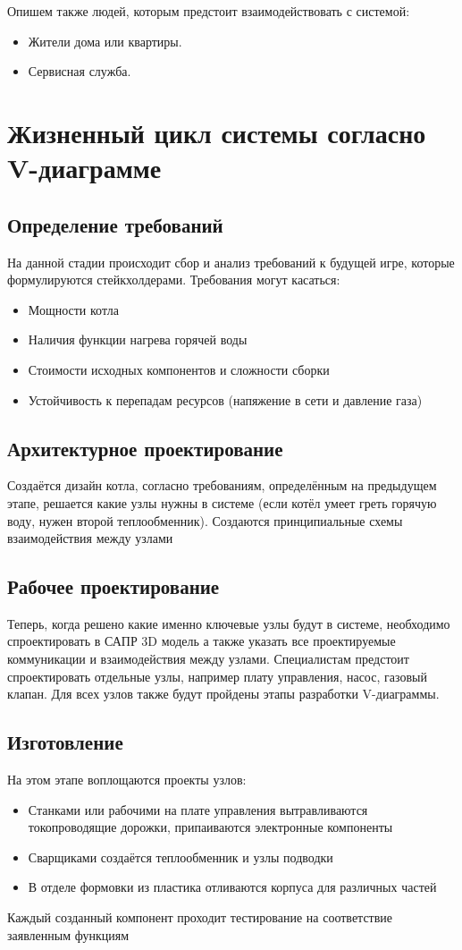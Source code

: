 \documentclass[bibliography=totocnumbered]{scrartcl}
\begin{document}
Опишем также людей, которым предстоит взаимодействовать с системой:
\begin{itemize}
  \item Жители дома или квартиры.
  \item Сервисная служба.
\end{itemize}

\section{Жизненный цикл системы согласно V-диаграмме}

\subsection{Определение требований}
На данной стадии происходит сбор и анализ требований к будущей
игре, которые формулируются стейкхолдерами. Требования могут касаться:
\begin{itemize}
  \item Мощности котла
  \item Наличия функции нагрева горячей воды
  \item Стоимости исходных компонентов и сложности сборки
  \item Устойчивость к перепадам ресурсов (напяжение в сети и давление газа)
\end{itemize}

\subsection{Архитектурное проектирование}
Создаётся дизайн котла, согласно требованиям, определённым на предыдущем этапе, решается какие узлы нужны в системе (если котёл умеет греть горячую воду, нужен второй теплообменник). Создаются принципиальные схемы взаимодействия между узлами

\subsection{Рабочее проектирование}
Теперь, когда решено какие именно ключевые узлы будут в системе, необходимо спроектировать в САПР 3D модель а также указать все проектируемые коммуникации и взаимодействия между узлами. Специалистам предстоит спроектировать отдельные узлы, например плату управления, насос, газовый клапан. Для всех узлов также будут пройдены этапы разработки V-диаграммы.

\subsection{Изготовление}
На этом этапе воплощаются проекты узлов:
\begin{itemize}
  \item Станками или рабочими на плате управления вытравливаются токопроводящие дорожки, припаиваются электронные компоненты
  \item Сварщиками создаётся теплообменник и узлы подводки
  \item В отделе формовки из пластика отливаются корпуса для различных частей
\end{itemize}
Каждый созданный компонент проходит тестирование на соответствие заявленным функциям
\end{document}

